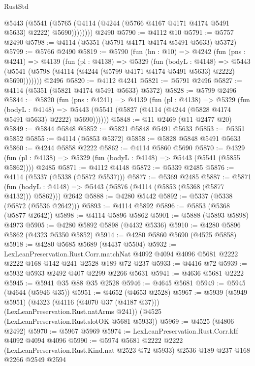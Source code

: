 \begin{lexlean}{RustStd}
\begin{coremodule}
            @5443
              (@5541 (@5765 (@4114 (@4244 (@5766 @4167 @4171 @4174 @5491 @5633) @2222) @5690))))))))
    @2490
@5790 := @4112 @10
@5791 := @5757 @2490
@5798 := @4114 (@5351 (@5791 @4171 @4174 @5491 @5633) @5372)
@5799 := @5766 @2490
@5819 := @5790
    (fun (hn : @10) =>
    @4242
      (fun (pns : @4241) =>
      @4139
        (fun (pl : @4138) =>
        @5329
          (fun (bodyL : @4148) =>
          @5443 (@5541 (@5798 (@4114 (@4244 (@5799 @4171 @4174 @5491 @5633) @2222) @5690)))))))
    @2496
@5820 := @4112 @4241
@5821 := @5791 @2496
@5827 := @4114 (@5351 (@5821 @4174 @5491 @5633) @5372)
@5828 := @5799 @2496
@5844 := @5820
    (fun (pns : @4241) =>
    @4139
      (fun (pl : @4138) =>
      @5329
        (fun (bodyL : @4148) =>
        @5443 (@5541 (@5827 (@4114 (@4244 (@5828 @4174 @5491 @5633) @2222) @5690))))))
@5848 := @11 @2469 (@11 @2477 @20)
@5849 := @5844 @5848
@5852 := @5821 @5848 @5491 @5633
@5853 := @5351 @5852
@5855 := @4114 (@5853 @5372)
@5858 := @5828 @5848 @5491 @5633
@5860 := @4244 @5858 @2222
@5862 := @4114 @5860 @5690
@5870 := @4329
    (fun (pl : @4138) => @5329 (fun (bodyL : @4148) => @5443 (@5541 (@5855 @5862))))
    @2485
@5871 := @4112 @4148
@5872 := @5339 @2485
@5876 := @4114 (@5337 (@5338 (@5872 @5537)))
@5877 := @5369 @2485
@5887 := @5871
    (fun (bodyL : @4148) => @5443 (@5876 (@4114 (@5853 (@5368 (@5877 @4132))) @5862)))
    @2642
@5888 := @4280 @5442
@5892 := @5337 (@5338 (@5872 (@5536 @2642)))
@5893 := @4114 @5892
@5896 := @5853 (@5368 (@5877 @2642))
@5898 := @4114 @5896 @5862
@5901 := @5888 (@5893 @5898) @4973
@5905 := @4280 @5892 @5898 (@4432 @5336)
@5910 := @4280 @5896 @5862 (@4323 @5350 @5852)
@5914 := @4280 @5860 @5690 (@4525 @5858)
@5918 := @4280 @5685 @5689 (@4437 @5504)
@5932 := LexLeanPreservation.Rust.Corr.matchNat
    @4092
    @4094
    @4096
    @5681
    @2222
    @2222
    @168
    @142
    @241
    @2528
    @189
    @72
    @237
@5933 := @4416 @72
@5939 := @5932 @5933 @2492 @407 @2299 @2266 @5631
@5941 := @4636 @5681 @2222
@5945 := @5941 @35 @88 @35 @2528
@5946 := @4645 @5681
@5949 := @5945 (@4644 (@5946 @35))
@5951 := @4652 (@4653 @2528)
@5967 := @5939
    (@5949 @5951)
    (@4323 (@4116 (@4070 @37 (@4187 @37))) (LexLeanPreservation.Rust.natArms @241))
    (@4525 (LexLeanPreservation.Rust.slotOK @5681 @5933))
@5969 := @4525 (@4806 @2492)
@5970 := @5967 @5969
@5974 := LexLeanPreservation.Rust.Corr.kIf @4092 @4094 @4096
@5990 := @5974
    @5681
    @2222
    @2222
    (LexLeanPreservation.Rust.Kind.nat @2523 @72 @5933)
    @2536
    @189
    @237
    @168
    @2266
    @2549
    @2594

\end{coremodule}
\end{lexlean}
